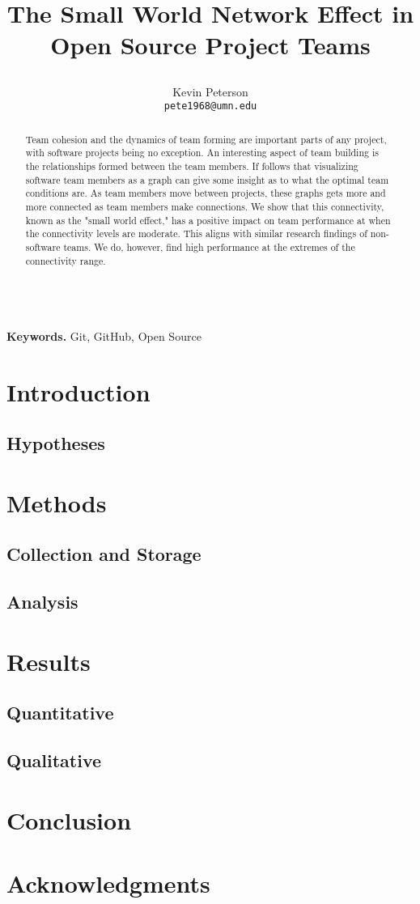 \documentclass{proc}
\title{
The Small World Network Effect in Open Source Project Teams
\author{Kevin Peterson\\
\small \texttt{pete1968@umn.edu}
}
}
\begin{document}
\maketitle

\begin{abstract}
Team cohesion and the dynamics of team forming are important parts of any project, with software projects being no exception. An interesting aspect of team building is the relationships formed between the team members. If follows that visualizing software team members as a graph can give some insight as to what the optimal team conditions are. As team members move between projects, these graphs gets more and more connected as team members make connections. We show that this connectivity, known as the "small world effect," has a positive impact on team performance at when the connectivity levels are moderate. This aligns with similar research findings of non-software teams. We do, however, find high performance at the extremes of the connectivity range.
\end{abstract}

\noindent \\\textbf{Keywords.} Git, GitHub, Open Source

\section{Introduction}


\subsection{Hypotheses}


\section{Methods}
\subsection{Collection and Storage}

\subsection{Analysis}

\section{Results}

\subsection{Quantitative}

\subsection{Qualitative}

\section{Conclusion}
\section{Acknowledgments}



\end{document}

